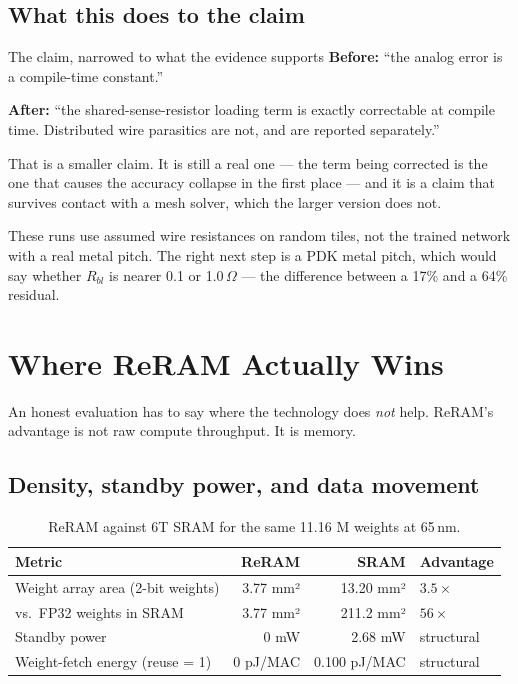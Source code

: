 \documentclass[11pt,a4paper]{report}
\begin{document}
\section{What this does to the claim}

\begin{keybox}{The claim, narrowed to what the evidence supports}
\textbf{Before:} ``the analog error is a compile-time constant.''

\textbf{After:} ``the shared-sense-resistor loading term is exactly
correctable at compile time. Distributed wire parasitics are not, and are
reported separately.''

That is a smaller claim. It is still a real one --- the term being corrected is
the one that causes the accuracy collapse in the first place --- and it is a
claim that survives contact with a mesh solver, which the larger version does
not.
\end{keybox}

These runs use assumed wire resistances on random tiles, not the trained
network with a real metal pitch. The right next step is a PDK metal pitch,
which would say whether $R_{bl}$ is nearer 0.1 or 1.0\,$\Omega$ --- the
difference between a 17\% and a 64\% residual.

\chapter{Where ReRAM Actually Wins}

An honest evaluation has to say where the technology does \emph{not} help.
ReRAM's advantage is not raw compute throughput. It is memory.

\section{Density, standby power, and data movement}

\begin{table}[h]
\centering
\caption{ReRAM against 6T SRAM for the same 11.16 M weights at 65\,nm.}
\begin{tabular}{lrrl}
\toprule
Metric & ReRAM & SRAM & Advantage \\
\midrule
Weight array area (2-bit weights) & 3.77 mm² & 13.20 mm² & $3.5\times$ \\
vs.\ FP32 weights in SRAM & 3.77 mm² & 211.2 mm² & $56\times$ \\
Standby power & 0 mW & 2.68 mW & structural \\
Weight-fetch energy (reuse = 1) & 0 pJ/MAC & 0.100 pJ/MAC & structural \\
\bottomrule
\end{tabular}
\end{table}
\end{document}
